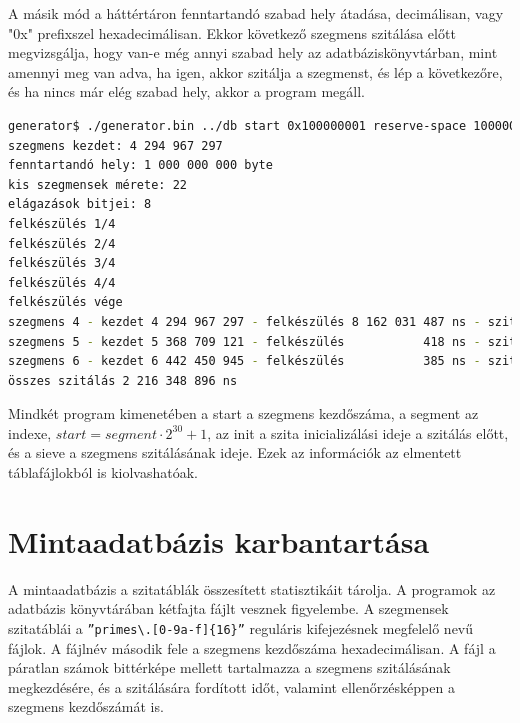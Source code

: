 A másik mód a háttértáron fenntartandó szabad hely átadása, decimálisan,
vagy "0x" prefixszel hexadecimálisan. Ekkor következő szegmens szitálása előtt
megvizsgálja, hogy van-e még annyi szabad hely az adatbáziskönyvtárban, mint
amennyi meg van adva, ha igen, akkor szitálja a szegmenst,
és lép a következőre,
és ha nincs már elég szabad hely, akkor a program megáll.

\begin{lstlisting}[language=bash]
generator$ ./generator.bin ../db start 0x100000001 reserve-space 1000000000
szegmens kezdet: 4 294 967 297
fenntartandó hely: 1 000 000 000 byte 
kis szegmensek mérete: 22
elágazások bitjei: 8
felkészülés 1/4
felkészülés 2/4
felkészülés 3/4
felkészülés 4/4
felkészülés vége
szegmens 4 - kezdet 4 294 967 297 - felkészülés 8 162 031 487 ns - szitálás 729 914 370 ns
szegmens 5 - kezdet 5 368 709 121 - felkészülés           418 ns - szitálás 736 412 117 ns
szegmens 6 - kezdet 6 442 450 945 - felkészülés           385 ns - szitálás 750 022 409 ns
összes szitálás 2 216 348 896 ns
\end{lstlisting}

Mindkét program kimenetében a start a szegmens kezdőszáma, a segment az indexe,
$start=segment \cdot 2^{30}+1$, az init a szita inicializálási ideje a szitálás előtt,
és a sieve a szegmens szitálásának ideje. Ezek az információk az elmentett
táblafájlokból is kiolvashatóak.

\section{Mintaadatbázis karbantartása}

A mintaadatbázis a szitatáblák összesített statisztikáit tárolja.
A programok az adatbázis könyvtárában kétfajta fájlt vesznek figyelembe.
A szegmensek szitatáblái a {\tt''primes\textbackslash.[0-9a-f]\{16\}''} reguláris kifejezésnek megfelelő nevű fájlok.
A fájlnév második fele a szegmens kezdőszáma hexadecimálisan.
A fájl a páratlan számok bittérképe mellett tartalmazza a szegmens
szitálásának megkezdésére, és a szitálására fordított időt,
valamint ellenőrzésképpen a szegmens kezdőszámát is.

